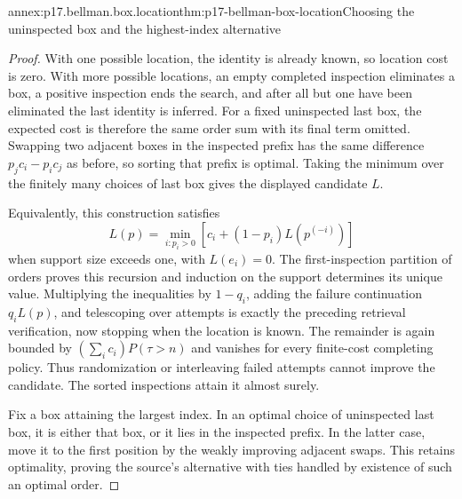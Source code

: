 \begin{annexitem}{annex:p17.bellman.box.location}{thm:p17-bellman-box-location}{Choosing the uninspected box and the highest-index alternative}
\begin{proof}
With one possible location,
the identity is already known,
so location cost is zero.
With more possible locations,
an empty completed inspection
eliminates a box, a positive
inspection ends the search,
and after all but one have
been eliminated the last
identity is inferred.
For a fixed uninspected last
box, the expected cost is
therefore the same order
sum with its final term
omitted.
Swapping two adjacent boxes
in the inspected prefix
has the same difference
\(p_jc_i-p_ic_j\) as before,
so sorting that prefix is
optimal. Taking the minimum
over the finitely many choices
of last box gives the
displayed candidate \(L\).

Equivalently, this construction
satisfies
\[
 L(p)=\min_{i:p_i>0}
          [c_i+(1-p_i)L(p^{(-i)})]
\]
when support size exceeds
one, with \(L(e_i)=0\).
The first-inspection
partition of orders proves
this recursion and induction
on the support determines
its unique value.
Multiplying the inequalities
by \(1-q_i\), adding the
failure continuation \(q_iL(p)\),
and telescoping over attempts
is exactly the preceding
retrieval verification, now
stopping when the location
is known. The remainder is
again bounded by
\((\sum_i c_i)P(\tau>n)\)
and vanishes for every
finite-cost completing policy.
Thus randomization or
interleaving failed attempts
cannot improve the candidate.
The sorted inspections attain
it almost surely.

Fix a box attaining the
largest index. In an optimal
choice of uninspected last
box, it is either that box,
or it lies in the inspected
prefix. In the latter case,
move it to the first position
by the weakly improving
adjacent swaps. This retains
optimality, proving the
source's alternative with
ties handled by existence
of such an optimal order.


\end{proof}
\end{annexitem}
